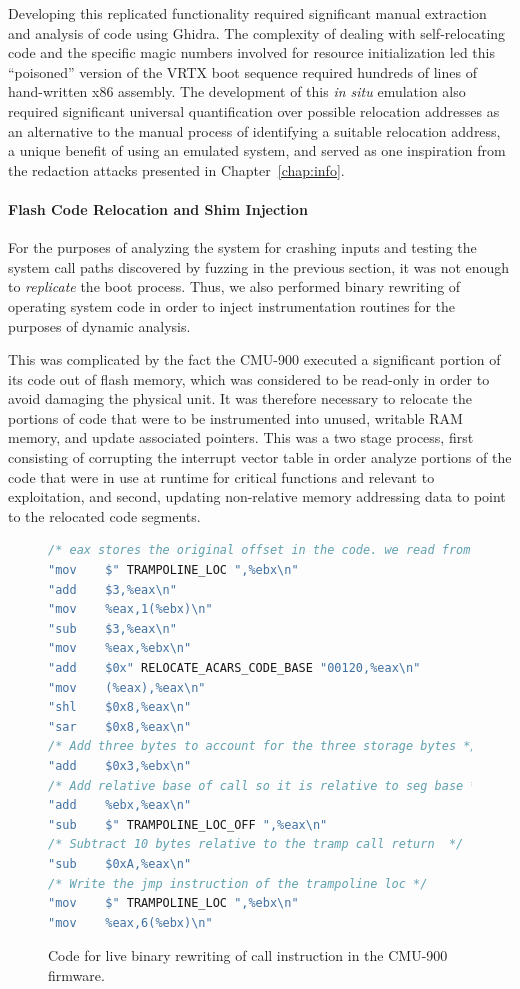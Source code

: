 Developing this replicated functionality required significant manual extraction and analysis of code using Ghidra.
The complexity of dealing with self-relocating code and the specific magic numbers involved for resource initialization led this ``poisoned'' version of the VRTX boot sequence required hundreds of lines of hand-written x86 assembly.
The development of this \emph{in situ} emulation also required significant universal quantification over possible relocation addresses as an alternative to the manual process of identifying a suitable relocation address, a unique benefit of using an emulated system, and served as one inspiration from the redaction attacks presented in Chapter~\ref{chap:info}.

\paragraph{Flash Code Relocation and Shim Injection}
For the purposes of analyzing the system for crashing inputs and testing the system call paths discovered by fuzzing in the previous section, it was not enough to \emph{replicate} the boot process.
Thus, we also performed binary rewriting of operating system code in order to inject instrumentation routines for the purposes of dynamic analysis.

This was complicated by the fact the CMU-900 executed a significant portion of its code out of flash memory, which was considered to be read-only in order to avoid damaging the physical unit.
It was therefore necessary to relocate the portions of code that were to be instrumented into unused, writable RAM memory, and update associated pointers.
This was a two stage process, first consisting of corrupting the interrupt vector table in order analyze portions of the code that were in use at runtime for critical functions and relevant to exploitation, and second, updating non-relative memory addressing data to point to the relocated code segments.

\begin{figure}
\begin{lstlisting}[language=C]
/* eax stores the original offset in the code. we read from this offset to get the relative offset the call lands at. We then change that offset so it is relative to the location of the trampoline call instruction. We then set it into the trampoline call instruction. */
"mov    $" TRAMPOLINE_LOC ",%ebx\n"
"add    $3,%eax\n"
"mov    %eax,1(%ebx)\n"
"sub    $3,%eax\n"
"mov    %eax,%ebx\n"
"add    $0x" RELOCATE_ACARS_CODE_BASE "00120,%eax\n"
"mov    (%eax),%eax\n"
"shl    $0x8,%eax\n"
"sar    $0x8,%eax\n"
/* Add three bytes to account for the three storage bytes */
"add    $0x3,%ebx\n"
/* Add relative base of call so it is relative to seg base */
"add    %ebx,%eax\n"
"sub    $" TRAMPOLINE_LOC_OFF ",%eax\n"
/* Subtract 10 bytes relative to the tramp call return  */
"sub    $0xA,%eax\n"
/* Write the jmp instruction of the trampoline loc */
"mov    $" TRAMPOLINE_LOC ",%ebx\n"
"mov    %eax,6(%ebx)\n"
\end{lstlisting}
\caption{Code for live binary rewriting of call instruction in the CMU-900 firmware.}
\label{fig:dynanal-code-cmu}
\end{figure}

